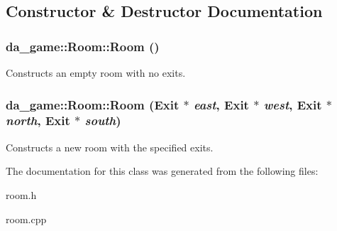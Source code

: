\subsection{Constructor \& Destructor Documentation}
\hypertarget{classda__game_1_1Room_aa36091a4e06c697468cd4e48da7d94c1}{
\subsubsection[{Room}]{\setlength{\rightskip}{0pt plus 5cm}da\_\-game::Room::Room ()}}
\label{classda__game_1_1Room_aa36091a4e06c697468cd4e48da7d94c1}
Constructs an empty room with no exits. \hypertarget{classda__game_1_1Room_ac8abf8b2bb0499d4008859ba8a5bb3d3}{
\subsubsection[{Room}]{\setlength{\rightskip}{0pt plus 5cm}da\_\-game::Room::Room ({\bf Exit} $\ast$ {\em east}, \/  {\bf Exit} $\ast$ {\em west}, \/  {\bf Exit} $\ast$ {\em north}, \/  {\bf Exit} $\ast$ {\em south})}}
\label{classda__game_1_1Room_ac8abf8b2bb0499d4008859ba8a5bb3d3}
Constructs a new room with the specified exits. 

The documentation for this class was generated from the following files:\begin{DoxyCompactItemize}
\item 
room.h\item 
room.cpp\end{DoxyCompactItemize}
